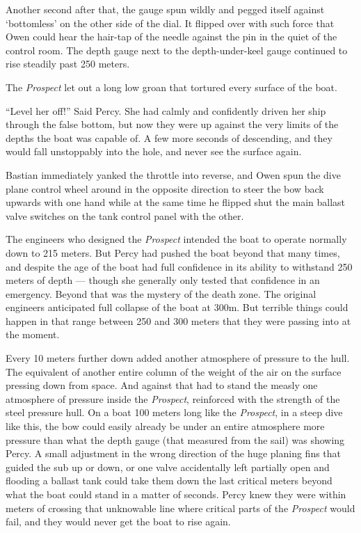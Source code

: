 \documentclass[
]{scrbook}
\begin{document}
Another second after that, the gauge spun wildly and pegged itself
against `bottomless' on the other side of the dial. It flipped over with
such force that Owen could hear the hair-tap of the needle against the
pin in the quiet of the control room. The depth gauge next to the
depth-under-keel gauge continued to rise steadily past 250 meters.

The \emph{Prospect} let out a long low groan that tortured every surface
of the boat.

``Level her off!'' Said Percy. She had calmly and confidently driven her
ship through the false bottom, but now they were up against the very
limits of the depths the boat was capable of. A few more seconds of
descending, and they would fall unstoppably into the hole, and never see
the surface again.

Bastian immediately yanked the throttle into reverse, and Owen spun the
dive plane control wheel around in the opposite direction to steer the
bow back upwards with one hand while at the same time he flipped shut
the main ballast valve switches on the tank control panel with the
other.

The engineers who designed the \emph{Prospect} intended the boat to
operate normally down to 215 meters. But Percy had pushed the boat
beyond that many times, and despite the age of the boat had full
confidence in its ability to withstand 250 meters of depth --- though
she generally only tested that confidence in an emergency. Beyond that
was the mystery of the death zone. The original engineers anticipated
full collapse of the boat at 300m. But terrible things could happen in
that range between 250 and 300 meters that they were passing into at the
moment.

Every 10 meters further down added another atmosphere of pressure to the
hull. The equivalent of another entire column of the weight of the air
on the surface pressing down from space. And against that had to stand
the measly one atmosphere of pressure inside the \emph{Prospect},
reinforced with the strength of the steel pressure hull. On a boat 100
meters long like the \emph{Prospect}, in a steep dive like this, the bow
could easily already be under an entire atmosphere more pressure than
what the depth gauge (that measured from the sail) was showing Percy. A
small adjustment in the wrong direction of the huge planing fins that
guided the sub up or down, or one valve accidentally left partially open
and flooding a ballast tank could take them down the last critical
meters beyond what the boat could stand in a matter of seconds. Percy
knew they were within meters of crossing that unknowable line where
critical parts of the \emph{Prospect} would fail, and they would never
get the boat to rise again.
\end{document}

